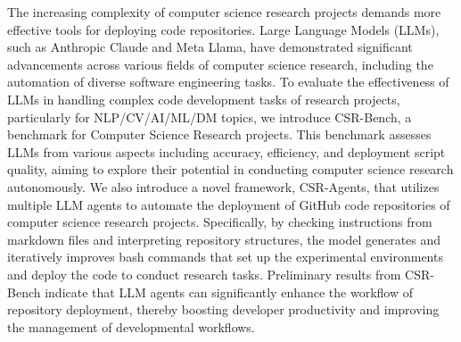 The increasing complexity of computer science research projects demands more effective tools for deploying code repositories. Large Language Models (LLMs), such as Anthropic Claude and Meta Llama, have demonstrated significant advancements across various fields of computer science research, including the automation of diverse software engineering tasks. 
To evaluate the effectiveness of LLMs in handling complex code development tasks of research projects, particularly for NLP/CV/AI/ML/DM topics, we introduce CSR-Bench, a benchmark for Computer Science Research projects. This benchmark assesses LLMs from various aspects including accuracy, efficiency, and deployment script quality, aiming to explore their potential in conducting computer science research autonomously. We also introduce a novel framework, CSR-Agents, that utilizes multiple LLM agents to automate the deployment of GitHub code repositories of computer science research projects. Specifically, by checking instructions from markdown files and interpreting repository structures, the model generates and iteratively improves bash commands that set up the experimental environments and deploy the code to conduct research tasks. Preliminary results from CSR-Bench indicate that LLM agents can significantly enhance the workflow of repository deployment, thereby boosting developer productivity and improving the management of developmental workflows. 